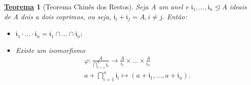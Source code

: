 \documentclass{article}
\newtheorem*{theorem*}{\underline{Teorema}}
\begin{document}
\hypertarget{chinese_remainder}{
  \begin{theorem*}[Teorema Chinês dos Restos]
    Seja A um anel e \(\mathfrak{i}_{1},\dotsc,\mathfrak{i}_{n}\trianglelefteq{A}\) ideais de A dois a dois coprimos, ou seja,
    \(\mathfrak{i}_{i}+\mathfrak{i}_{j}=A, i\neq j.\) Então:
    \begin{itemize}
      \item[1)] \(\mathfrak{i}_{1}\cdot \dotsc \cdot \mathfrak{i}_{n} = \mathfrak{i}_{1}\cap \dotsc\cap \mathfrak{i}_{n};\)
      \item[2)] Existe um isomorfismo 
        \begin{align*}
  &\varphi :\frac{A}{\bigcap_{i=1}^{n}\mathfrak{i}_{i}}\rightarrow \frac{A}{\mathfrak{i}_{1}}\times \dotsc\times \frac{A}{\mathfrak{i}_{n}}\\
  &a+\bigcap_{i=1}^{n}\mathfrak{i}_{i}\mapsto(a+\mathfrak{i}_{1}, \dotsc, a+\mathfrak{i}_{n}).
        \end{align*}
    \end{itemize} 
\end{theorem*}}
\end{document}
